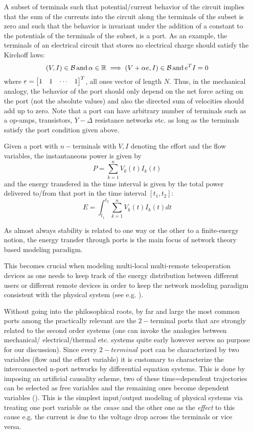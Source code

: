 A subset of terminals such that potential/current behavior of the circuit implies that the sum of the currents into the 
circuit along the terminals of the subset is zero and such that the behavior is invariant under the addition of a constant 
to the potentials of the terminals of the subset, is a port. As an example, the terminals of an electrical circuit that stores no electrical 
charge should satisfy the Kirchoff laws: 
\[
(V,I) \in \mathcal{B}\,\text{and}\, \alpha\in\mathbb{R} \implies (V+\alpha e,I) \in \mathcal{B}\,\text{and}\, e^T I = 0
\]
where $e=\begin{bmatrix}1&1&\cdots&1\end{bmatrix}^T$, all ones vector of length $N$. Thus, in the mechanical analogy, the behavior of the 
port should only depend on the net force acting on the port (not the absolute values) and also the directed sum of 
velocities should add up to zero. Note that a port can have arbitrary number of terminals such as a op-amps, transistors, 
$Y-\Delta$ resistance networks etc. as long as the terminals satisfy the port condition given above. 

Given a port with $n-$terminals with $V,I$ denoting the effort and the flow variables, the instantaneous power is given by 
\[
P = \sum_{k=1}^n{V_k(t)I_k(t)}
\]
and the energy transfered in the time interval is given by the total power delivered
to/from that port in the time interval $[t_1,t_2]$: 
\[
E = \int^{t_{2}}_{t_{1}}\sum_{k=1}^n{V_k(t)I_k(t)}dt
\]

As almost always stability is related to one way or the other to a finite-energy notion, the energy transfer through ports
is the main focus of network theory based modeling paradigm.

This becomes crucial when modeling multi-local multi-remote teleoperation devices
as one needs to keep track of the energy distribution between different users or different remote devices in order to 
keep the network modeling paradigm consistent with the physical system (see e.g. \cite{panzirsch}).

Without going into the philosophical roots, by far and large the most common ports among the practically relevant are the 
$2-$terminal ports that are strongly related to the second order systems (one can invoke the analogies between mechanical/%
electrical/thermal etc. systems quite early however serves no purpose for our discussion).  Since every $2-terminal$ port
can be characterized by two variables (flow and the effort variable) it is customary to characterize the interconnected
n-port networks by differential equation systems. This is done by imposing an artificial causality scheme, 
two of these time=dependent trajectories can be selected as free variables and the remaining ones become dependent variables 
(\cite{behavbook}). This is the simplest input/output modeling of physical systems via treating one port variable as the 
\emph{cause} and the other one as the \emph{effect} to this cause e.g. the current is due to the voltage drop across the terminals or 
vice versa. 




